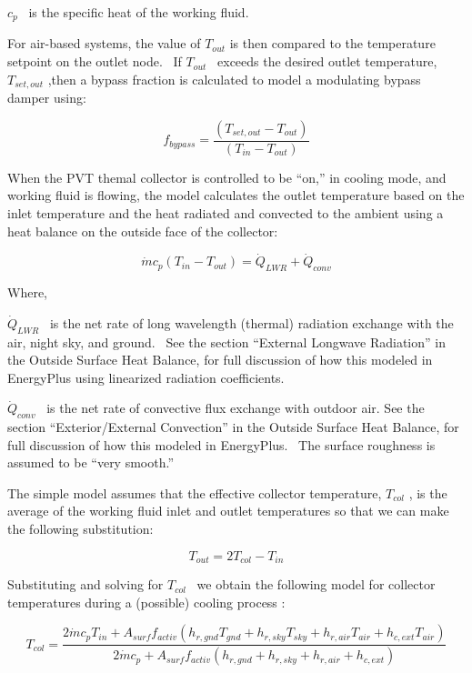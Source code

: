\({c_p}\) ~is the specific heat of the working fluid.

For air-based systems, the value of \({T_{out}}\) is then compared to the temperature setpoint on the outlet node.~ If \({T_{out}}\) ~exceeds the desired outlet temperature, \({T_{set,out}}\) ,then a bypass fraction is calculated to model a modulating bypass damper using:

\begin{equation}
{f_{bypass}} = \frac{{\left( {{T_{set,out}} - {T_{out}}} \right)}}{{\left( {{T_{in}} - {T_{out}}} \right)}}
\end{equation}

When the PVT themal collector is controlled to be ``on,'' in cooling mode, and working fluid is flowing, the model calculates the outlet temperature based on the inlet temperature and the heat radiated and convected to the ambient using a heat balance on the outside face of the collector:

\begin{equation}
\dot m{c_p}\left( {{T_{in}} - {T_{out}}} \right) = {\dot Q_{LWR}} + {\dot Q_{conv}}
\end{equation}

Where,

\({\dot Q_{LWR}}\) ~is the net rate of long wavelength (thermal) radiation exchange with the air, night sky, and ground.~ See the section ``External Longwave Radiation'' in the Outside Surface Heat Balance, for full discussion of how this modeled in EnergyPlus using linearized radiation coefficients.

\({\dot Q_{conv}}\) ~is the net rate of convective flux exchange with outdoor air. See the section ``Exterior/External Convection'' in the Outside Surface Heat Balance, for full discussion of how this modeled in EnergyPlus.~ The surface roughness is assumed to be ``very smooth.''

The simple model assumes that the effective collector temperature, \({T_{col}}\) , is the average of the working fluid inlet and outlet temperatures so that we can make the following substitution:

\begin{equation}
{T_{out}} = 2{T_{col}} - {T_{in}}
\end{equation}

Substituting and solving for \({T_{col}}\) ~we obtain the following model for collector temperatures during a (possible) cooling process :

\begin{equation}
{T_{col}} = \frac{{2\dot m{c_p}{T_{in}} + {A_{surf}}{f_{activ}}\left( {{h_{r,gnd}}{T_{gnd}} + {h_{r,sky}}{T_{sky}} + {h_{r,air}}{T_{air}} + {h_{c,ext}}{T_{air}}} \right)}}{{2\dot m{c_p} + {A_{surf}}{f_{activ}}\left( {{h_{r,gnd}} + {h_{r,sky}} + {h_{r,air}} + {h_{c,ext}}} \right)}}
\end{equation}

